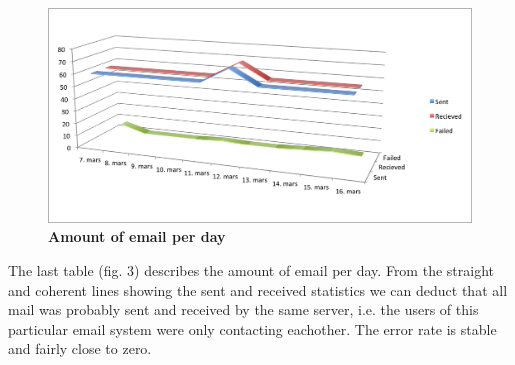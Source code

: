 \begin{figure}[h!]
  \begin{center}
    \includegraphics[scale=0.70]{img/sent-received-failed.png}
  \end{center}
  \caption{\bf{Amount of email per day}}
\end{figure}

The last table (fig. 3) describes the amount of email per day. From the straight and coherent lines showing the sent and received statistics we can deduct that all mail was probably sent and received by the same server, i.e. the users of this particular email system were only contacting eachother. The error rate is stable and fairly close to zero.\newline
